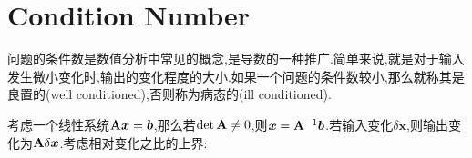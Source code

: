 \chapter{Condition Number}
问题的条件数是数值分析中常见的概念,是导数的一种推广.简单来说,就是对于输入发生微小变化时,输出的变化程度的大小.如果一个问题的条件数较小,那么就称其是良置的(well conditioned),否则称为病态的(ill conditioned).

考虑一个线性系统$\bold{A} \bm x = \bm b$,那么若$\det \bold{A} \ne 0$,则$\bm x = \bold{A}^{-1}\bm b$.若输入变化$\delta \bm x$,则输出变化为$\bold{A} \delta \bm x$.考虑相对变化之比的上界: